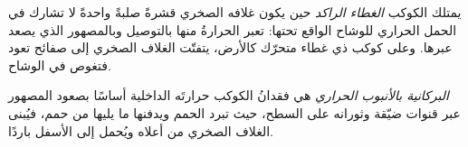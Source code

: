 \begin{definition}\label{def:b3:planetary-interiors-surfaces:stagnant-lid}
يمتلك الكوكب \emph{الغطاء الراكد} حين يكون غلافه الصخري
قشرةً صلبةً واحدةً لا تشارك في الحمل الحراري للوشاح
الواقع تحتها: تعبر الحرارةُ منها بالتوصيل وبالمصهور الذي يصعد
عبرها. وعلى كوكب ذي غطاء متحرّك كالأرض، يتفتّت الغلاف الصخري
إلى صفائح تعود فتغوص في الوشاح.
\end{definition}

\begin{definition}\label{def:b3:planetary-interiors-surfaces:heat-pipe}
\emph{البركانية بالأنبوب الحراري} هي فقدانُ الكوكب حرارتَه الداخلية أساسًا
بصعود المصهور عبر قنوات ضيّقة وثورانه على السطح،
حيث تبرد الحمم ويدفنها ما يليها من حمم،
فيُبنى الغلاف الصخري من أعلاه ويُحمل إلى الأسفل باردًا.
\end{definition}

